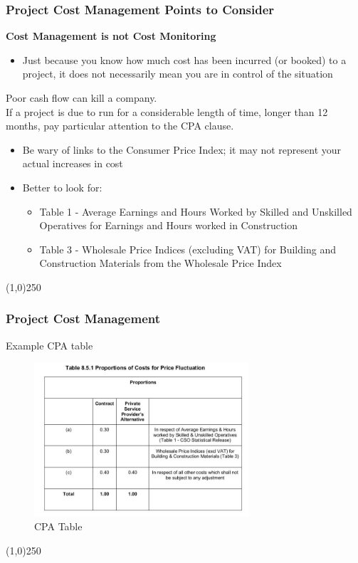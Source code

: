 \begin{frame}
\frametitle{Project Cost Management \hfill Points to Consider}
\textbf{Cost Management is not Cost Monitoring}
\begin{itemize}
	\item Just because you know how much cost has been incurred (or booked) to a project, it does not necessarily mean you are in control of the situation
\end{itemize}
Poor cash flow can kill a company.\\
If a project is due to run for a considerable length of time, longer than 12 months, pay particular attention to the CPA clause.
	\begin{itemize}
		\item Be wary of links to the Consumer Price Index; it may not represent your actual increases in cost
		\item Better to look for:
		\begin{itemize}
			\item Table 1 - Average Earnings and Hours Worked by Skilled and Unskilled Operatives for Earnings and Hours worked in Construction
			\item Table 3 - Wholesale Price Indices (excluding VAT) for Building and Construction Materials from the Wholesale Price Index
		\end{itemize}
	\end{itemize}
\end{frame}
\begin{center}\line(1,0){250}\end{center}







\begin{frame}
\frametitle{Project Cost Management}
Example CPA table
\begin{figure}
	\centering
		\includegraphics[width = 8cm]{images/CPA.jpg}
	\caption{CPA Table}
	\label{fig:CPA}
\end{figure}
\end{frame}
\begin{center}\line(1,0){250}\end{center}






